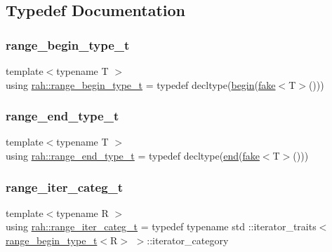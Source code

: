 \subsection{Typedef Documentation}
\mbox{\label{namespacerah_a28aff4eeddcece6be65ff0b956d32d4a}} 
\subsubsection{\texorpdfstring{range\_begin\_type\_t}{range\_begin\_type\_t}}
{\footnotesize\ttfamily template$<$typename T $>$ \\
using \mbox{\hyperlink{namespacerah_a28aff4eeddcece6be65ff0b956d32d4a}{rah\+::range\+\_\+begin\+\_\+type\+\_\+t}} = typedef decltype(\mbox{\hyperlink{namespacerah_a2c4a19e57cc4e0753e93830f247def6d}{begin}}(\mbox{\hyperlink{namespacerah_a11785bbdf970efa1bc57fc14993b77bf}{fake}}$<$T$>$()))}

\mbox{\label{namespacerah_a9657e24ae477f4482225b133fe286b65}} 
\subsubsection{\texorpdfstring{range\_end\_type\_t}{range\_end\_type\_t}}
{\footnotesize\ttfamily template$<$typename T $>$ \\
using \mbox{\hyperlink{namespacerah_a9657e24ae477f4482225b133fe286b65}{rah\+::range\+\_\+end\+\_\+type\+\_\+t}} = typedef decltype(\mbox{\hyperlink{namespacerah_aaddd1442cd76b96876e692cdefe7261d}{end}}(\mbox{\hyperlink{namespacerah_a11785bbdf970efa1bc57fc14993b77bf}{fake}}$<$T$>$()))}

\mbox{\label{namespacerah_a7cdcceefd4c7ad3abffb96560d24517d}} 
\subsubsection{\texorpdfstring{range\_iter\_categ\_t}{range\_iter\_categ\_t}}
{\footnotesize\ttfamily template$<$typename R $>$ \\
using \mbox{\hyperlink{namespacerah_a7cdcceefd4c7ad3abffb96560d24517d}{rah\+::range\+\_\+iter\+\_\+categ\+\_\+t}} = typedef typename std \+::iterator\+\_\+traits$<$\mbox{\hyperlink{namespacerah_a28aff4eeddcece6be65ff0b956d32d4a}{range\+\_\+begin\+\_\+type\+\_\+t}}$<$R$>$ $>$\+::iterator\+\_\+category}

